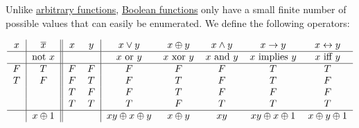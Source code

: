 \begin{definition}\label{def:boolean_operators}
  Unlike \hyperref[def:function/single_valued]{arbitrary functions}, \hyperref[def:boolean_function]{Boolean functions} only have a small finite number of possible values that can easily be enumerated. We define the following operators:

  \begin{equation*}
    \begin{tabular}{c | c || c c | c c c c c c}
      \( x \) & \( \Ol{x} \)     & \( x \) & \( y \) & \( x \vee y \)             & \( x \oplus y \)    & \( x \wedge y \)    & \( x \rightarrow y \)      & \( x \leftrightarrow y \) \\
      \hline
              & not \( x \)      &         &         & \( x \) or \( y \)         & \( x \) xor \( y \) & \( x \) and \( y \) & \( x \) implies \( y \)    & \( x \) iff \( y \)       \\
      \hline
      \( F \) & \( T \)          & \( F \) & \( F \) & \( F \)                    & \( F \)             & \( F \)             & \( T \)                    & \( T \)                   \\
      \( T \) & \( F \)          & \( F \) & \( T \) & \( F \)                    & \( T \)             & \( F \)             & \( T \)                    & \( F \)                   \\
              &                  & \( T \) & \( F \) & \( F \)                    & \( T \)             & \( F \)             & \( F \)                    & \( F \)                   \\
              &                  & \( T \) & \( T \) & \( T \)                    & \( F \)             & \( T \)             & \( T \)                    & \( T \)                   \\
      \hline
              & \( x \oplus 1 \) &         &         & \( xy \oplus x \oplus y \) & \( x \oplus y \)    & \( xy \)            & \( xy \oplus x \oplus 1 \) & \( x \oplus y \oplus 1 \)
    \end{tabular}
  \end{equation*}
\end{definition}

